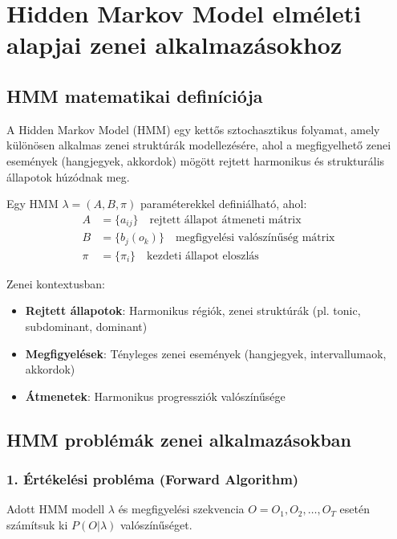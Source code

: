 \section{Hidden Markov Model elméleti alapjai zenei alkalmazásokhoz}

\subsection{HMM matematikai definíciója}

A Hidden Markov Model (HMM) egy kettős sztochasztikus folyamat, amely különösen alkalmas zenei struktúrák modellezésére, ahol a megfigyelhető zenei események (hangjegyek, akkordok) mögött rejtett harmonikus és strukturális állapotok húzódnak meg.

\begin{definition}
Egy HMM $\lambda = (A, B, \pi)$ paraméterekkel definiálható, ahol:
\begin{align}
A &= \{a_{ij}\} \quad \text{rejtett állapot átmeneti mátrix} \\
B &= \{b_j(o_k)\} \quad \text{megfigyelési valószínűség mátrix} \\
\pi &= \{\pi_i\} \quad \text{kezdeti állapot eloszlás}
\end{align}
\end{definition}

Zenei kontextusban:
\begin{itemize}
    \item \textbf{Rejtett állapotok}: Harmonikus régiók, zenei struktúrák (pl. tonic, subdominant, dominant)
    \item \textbf{Megfigyelések}: Tényleges zenei események (hangjegyek, intervallumaok, akkordok)
    \item \textbf{Átmenetek}: Harmonikus progressziók valószínűsége
\end{itemize}

\subsection{HMM problémák zenei alkalmazásokban}

\subsubsection{1. Értékelési probléma (Forward Algorithm)}

Adott HMM modell $\lambda$ és megfigyelési szekvencia $O = O_1, O_2, \ldots, O_T$ esetén számítsuk ki $P(O|\lambda)$ valószínűséget.

